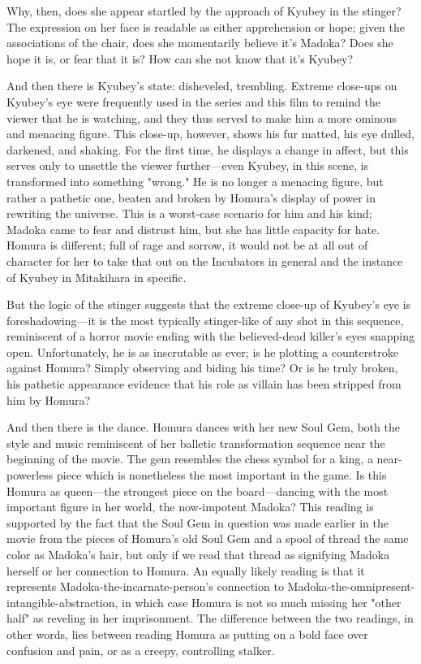 Why, then, does she appear startled by the approach of Kyubey in the stinger? The expression on her face is readable as either apprehension or hope; given the associations of the chair, does she momentarily believe it's Madoka? Does she hope it is, or fear that it is? How can she not know that it's Kyubey?

And then there is Kyubey's state: disheveled, trembling. Extreme close-ups on Kyubey's eye were frequently used in the series and this film to remind the viewer that he is watching, and they thus served to make him a more ominous and menacing figure. This close-up, however, shows his fur matted, his eye dulled, darkened, and shaking. For the first time, he displays a change in affect, but this serves only to unsettle the viewer further—even Kyubey, in this scene, is transformed into something "wrong." He is no longer a menacing figure, but rather a pathetic one, beaten and broken by Homura's display of power in rewriting the universe. This is a worst-case scenario for him and his kind; Madoka came to fear and distrust him, but she has little capacity for hate. Homura is different; full of rage and sorrow, it would not be at all out of character for her to take that out on the Incubators in general and the instance of Kyubey in Mitakihara in specific.

But the logic of the stinger suggests that the extreme close-up of Kyubey's eye is foreshadowing—it is the most typically stinger-like of any shot in this sequence, reminiscent of a horror movie ending with the believed-dead killer's eyes snapping open. Unfortunately, he is as inscrutable as ever; is he plotting a counterstroke against Homura? Simply observing and biding his time? Or is he truly broken, his pathetic appearance evidence that his role as villain has been stripped from him by Homura?

And then there is the dance. Homura dances with her new Soul Gem, both the style and music reminiscent of her balletic transformation sequence near the beginning of the movie. The gem resembles the chess symbol for a king, a near-powerless piece which is nonetheless the most important in the game. Is this Homura as queen—the strongest piece on the board—dancing with the most important figure in her world, the now-impotent Madoka? This reading is supported by the fact that the Soul Gem in question was made earlier in the movie from the pieces of Homura's old Soul Gem and a spool of thread the same color as Madoka's hair, but only if we read that thread as signifying Madoka herself or her connection to Homura. An equally likely reading is that it represents Madoka-the-incarnate-person's connection to Madoka-the-omnipresent-intangible-abstraction, in which case Homura is not so much missing her "other half" as reveling in her imprisonment. The difference between the two readings, in other words, lies between reading Homura as putting on a bold face over confusion and pain, or as a creepy, controlling stalker.

